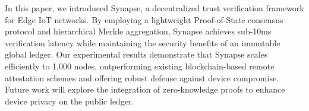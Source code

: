 In this paper, we introduced Synapse, a decentralized trust verification framework for Edge IoT networks. By employing a lightweight Proof-of-State consensus protocol and hierarchical Merkle aggregation, Synapse achieves sub-10ms verification latency while maintaining the security benefits of an immutable global ledger. Our experimental results demonstrate that Synapse scales efficiently to 1,000 nodes, outperforming existing blockchain-based remote attestation schemes and offering robust defense against device compromise. Future work will explore the integration of zero-knowledge proofs to enhance device privacy on the public ledger.
